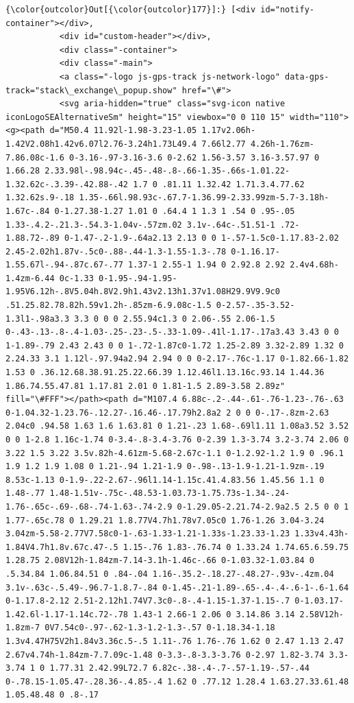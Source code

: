 \documentclass[11pt]{article}
\begin{document}
\begin{Verbatim}[commandchars=\\\{\}]
{\color{outcolor}Out[{\color{outcolor}177}]:} [<div id="notify-container"></div>,
           <div id="custom-header"></div>,
           <div class="-container">
           <div class="-main">
           <a class="-logo js-gps-track js-network-logo" data-gps-track="stack\_exchange\_popup.show" href="\#">
           <svg aria-hidden="true" class="svg-icon native iconLogoSEAlternativeSm" height="15" viewbox="0 0 110 15" width="110"><g><path d="M50.4 11.92l-1.98-3.23-1.05 1.17v2.06h-1.42V2.08h1.42v6.07l2.76-3.24h1.73L49.4 7.66l2.77 4.26h-1.76zm-7.86.08c-1.6 0-3.16-.97-3.16-3.6 0-2.62 1.56-3.57 3.16-3.57.97 0 1.66.28 2.33.98l-.98.94c-.45-.48-.8-.66-1.35-.66s-1.01.22-1.32.62c-.3.39-.42.88-.42 1.7 0 .81.11 1.32.42 1.71.3.4.77.62 1.32.62s.9-.18 1.35-.66l.98.93c-.67.7-1.36.99-2.33.99zm-5.7-3.18h-1.67c-.84 0-1.27.38-1.27 1.01 0 .64.4 1 1.3 1 .54 0 .95-.05 1.33-.4.2-.21.3-.54.3-1.04v-.57zm.02 3.1v-.64c-.51.51-1 .72-1.88.72-.89 0-1.47-.2-1.9-.64a2.13 2.13 0 0 1-.57-1.5c0-1.17.83-2.02 2.45-2.02h1.87v-.5c0-.88-.44-1.3-1.55-1.3-.78 0-1.16.17-1.55.67l-.94-.87c.67-.77 1.37-1 2.55-1 1.94 0 2.92.8 2.92 2.4v4.68h-1.4zm-6.44 0c-1.33 0-1.95-.94-1.95-1.95V6.12h-.8V5.04h.8V2.9h1.43v2.13h1.37v1.08H29.9V9.9c0 .51.25.82.78.82h.59v1.2h-.85zm-6.9.08c-1.5 0-2.57-.35-3.52-1.3l1-.98a3.3 3.3 0 0 0 2.55.94c1.3 0 2.06-.55 2.06-1.5 0-.43-.13-.8-.4-1.03-.25-.23-.5-.33-1.09-.41l-1.17-.17a3.43 3.43 0 0 1-1.89-.79 2.43 2.43 0 0 1-.72-1.87c0-1.72 1.25-2.89 3.32-2.89 1.32 0 2.24.33 3.1 1.12l-.97.94a2.94 2.94 0 0 0-2.17-.76c-1.17 0-1.82.66-1.82 1.53 0 .36.12.68.38.91.25.22.66.39 1.12.46l1.13.16c.93.14 1.44.36 1.86.74.55.47.81 1.17.81 2.01 0 1.81-1.5 2.89-3.58 2.89z" fill="\#FFF"></path><path d="M107.4 6.88c-.2-.44-.61-.76-1.23-.76-.63 0-1.04.32-1.23.76-.12.27-.16.46-.17.79h2.8a2 2 0 0 0-.17-.8zm-2.63 2.04c0 .94.58 1.63 1.6 1.63.81 0 1.21-.23 1.68-.69l1.11 1.08a3.52 3.52 0 0 1-2.8 1.16c-1.74 0-3.4-.8-3.4-3.76 0-2.39 1.3-3.74 3.2-3.74 2.06 0 3.22 1.5 3.22 3.5v.82h-4.61zm-5.68-2.67c-1.1 0-1.2.92-1.2 1.9 0 .96.1 1.9 1.2 1.9 1.08 0 1.21-.94 1.21-1.9 0-.98-.13-1.9-1.21-1.9zm-.19 8.53c-1.13 0-1.9-.22-2.67-.96l1.14-1.15c.41.4.83.56 1.45.56 1.1 0 1.48-.77 1.48-1.51v-.75c-.48.53-1.03.73-1.75.73s-1.34-.24-1.76-.65c-.69-.68-.74-1.63-.74-2.9 0-1.29.05-2.21.74-2.9a2.5 2.5 0 0 1 1.77-.65c.78 0 1.29.21 1.8.77V4.7h1.78v7.05c0 1.76-1.26 3.04-3.24 3.04zm-5.58-2.77V7.58c0-1-.63-1.33-1.21-1.33s-1.23.33-1.23 1.33v4.43h-1.84V4.7h1.8v.67c.47-.5 1.15-.76 1.83-.76.74 0 1.33.24 1.74.65.6.59.75 1.28.75 2.08V12h-1.84zm-7.14-3.1h-1.46c-.66 0-1.03.32-1.03.84 0 .5.34.84 1.06.84.51 0 .84-.04 1.16-.35.2-.18.27-.48.27-.93v-.4zm.04 3.1v-.63c-.5.49-.96.7-1.8.7-.84 0-1.45-.21-1.89-.65-.4-.4-.6-1-.6-1.64 0-1.17.8-2.12 2.51-2.12h1.74V7.3c0-.8-.4-1.15-1.37-1.15-.7 0-1.03.17-1.42.6l-1.17-1.14c.72-.78 1.43-1 2.66-1 2.06 0 3.14.86 3.14 2.58V12h-1.8zm-7 0V7.54c0-.97-.62-1.3-1.2-1.3-.57 0-1.18.34-1.18 1.3v4.47H75V2h1.84v3.36c.5-.5 1.11-.76 1.76-.76 1.62 0 2.47 1.13 2.47 2.67v4.74h-1.84zm-7.7.09c-1.48 0-3.3-.8-3.3-3.76 0-2.97 1.82-3.74 3.3-3.74 1 0 1.77.31 2.42.99L72.7 6.82c-.38-.4-.7-.57-1.19-.57-.44 0-.78.15-1.05.47-.28.36-.4.85-.4 1.62 0 .77.12 1.28.4 1.63.27.33.61.48 1.05.48.48 0 .8-.17 
\end{Verbatim}
\end{document}
